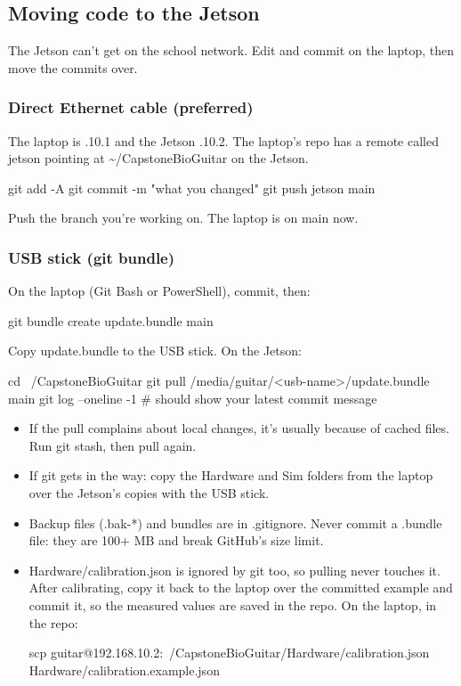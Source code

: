 \documentclass[11pt,letterpaper]{article}
\newcommand{\code}[1]{\textcolor{codeblue}{\ttfamily\smaller\relax #1}}
\begin{document}
\subsection{Moving code to the Jetson}
The Jetson can't get on the school network. Edit and commit on the laptop, then move the commits over.


\subsubsection*{Direct Ethernet cable (preferred)}
The laptop is \code{192.168.10.1} and the Jetson \code{192.168.10.2}. The laptop's repo has a remote called \code{jetson} pointing at \code{\textasciitilde{}/\allowbreak{}CapstoneBioGuitar} on the Jetson.

\begin{codeblock}
git add -A
git commit -m "what you changed"
git push jetson main
\end{codeblock}
Push the branch you're working on. The laptop is on \code{main} now.


\subsubsection*{USB stick (git bundle)}
On the laptop (Git Bash or PowerShell), commit, then:

\begin{codeblock}
git bundle create update.bundle main
\end{codeblock}
Copy \code{update.bundle} to the USB stick. On the Jetson:

\begin{codeblock}
cd ~/CapstoneBioGuitar
git pull /media/guitar/<usb-name>/update.bundle main
git log --oneline -1          # should show your latest commit message
\end{codeblock}
\begin{itemize}
  \item If the pull complains about local changes, it's usually because of cached files. Run \code{git stash}, then pull again.
  \item If git gets in the way: copy the \code{Hardware} and \code{Sim} folders from the laptop over the Jetson's copies with the USB stick.
  \item Backup files (\code{*.bak-{}*}) and bundles are in \code{.gitignore}. Never commit a \code{.bundle} file: they are 100+ MB and break GitHub's size limit.
  \item \code{Hardware/\allowbreak{}calibration.json} is ignored by git too, so pulling never touches it. After calibrating, copy it back to the laptop over the committed example and commit it, so the measured values are saved in the repo. On the laptop, in the repo:
\begin{codeblock}
scp guitar@192.168.10.2:~/CapstoneBioGuitar/Hardware/calibration.json Hardware/calibration.example.json
\end{codeblock}
\end{itemize}
\end{document}

